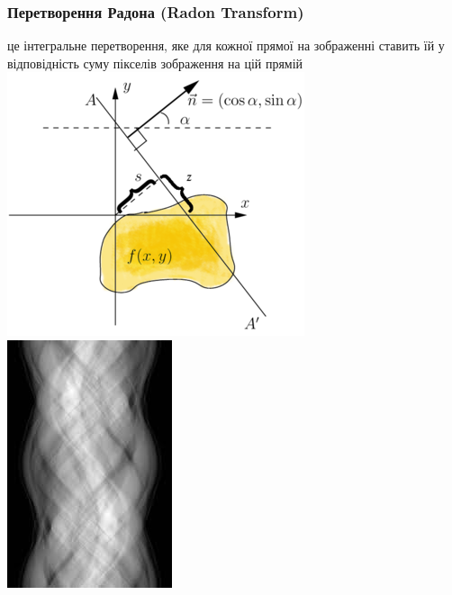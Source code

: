 \documentclass[12pt]{beamer}
\begin{document}
\begin{frame}\frametitle{Перетворення Радона (Radon Transform) }
	це інтегральне перетворення, яке для кожної прямої на зображенні ставить їй у відповідність суму пікселів зображення на цій прямій\linebreak
	\includegraphics[scale=0.4]{images/radon} \texttt{}
	\includegraphics[scale=0.4]{images/sinogram} 
\end{frame}
\end{document}
